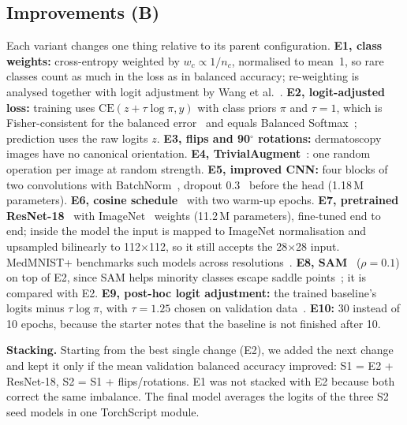 \documentclass[conference]{IEEEtran}
\begin{document}
\subsection{Improvements (B)}
Each variant changes one thing relative to its parent configuration.
\textbf{E1, class weights:} cross-entropy weighted by $w_c \propto 1/n_c$, normalised to mean~1, so rare
classes count as much in the loss as in balanced accuracy; re-weighting is analysed together with logit
adjustment by Wang et al.~\cite{wang2023unified}.
\textbf{E2, logit-adjusted loss:} training uses $\mathrm{CE}(z + \tau \log \pi, y)$ with class priors $\pi$ and
$\tau = 1$, which is Fisher-consistent for the balanced error~\cite{menon2021logit} and equals Balanced
Softmax~\cite{ren2020balanced}; prediction uses the raw logits $z$.
\textbf{E3, flips and 90$^\circ$ rotations:} dermatoscopy images have no canonical orientation.
\textbf{E4, TrivialAugment}~\cite{muller2021trivialaugment}: one random operation per image at random strength.
\textbf{E5, improved CNN:} four blocks of two convolutions with BatchNorm~\cite{ioffe2015batchnorm}, dropout
0.3~\cite{srivastava2014dropout} before the head (1.18\,M parameters).
\textbf{E6, cosine schedule}~\cite{loshchilov2017sgdr} with two warm-up epochs.
\textbf{E7, pretrained ResNet-18}~\cite{he2016resnet} with ImageNet~\cite{deng2009imagenet} weights
(11.2\,M parameters), fine-tuned end to end; inside the model the input is mapped to ImageNet normalisation and
upsampled bilinearly to 112$\times$112, so it still accepts the 28$\times$28 input. MedMNIST+ benchmarks such
models across resolutions~\cite{doerrich2025medmnistplus}.
\textbf{E8, SAM}~\cite{foret2021sam} ($\rho = 0.1$) on top of E2, since SAM helps minority classes escape saddle
points~\cite{rangwani2022escaping}; it is compared with E2.
\textbf{E9, post-hoc logit adjustment:} the trained baseline's logits minus $\tau \log \pi$, with
$\tau = 1.25$ chosen on validation data~\cite{menon2021logit}.
\textbf{E10:} 30 instead of 10 epochs, because the starter notes that the baseline is not finished after 10.

\textbf{Stacking.} Starting from the best single change (E2), we added the next change and kept it only if the
mean validation balanced accuracy improved: S1 = E2 + ResNet-18, S2 = S1 + flips/rotations. E1 was not stacked
with E2 because both correct the same imbalance. The final model averages the logits of the three S2 seed
models in one TorchScript module.
\end{document}
